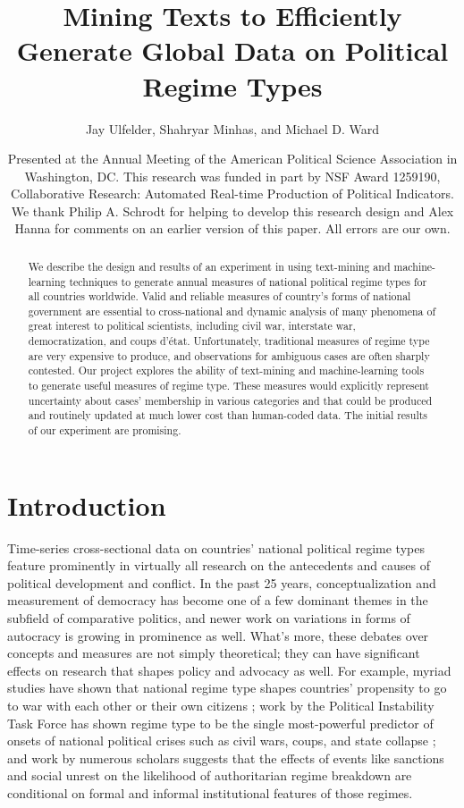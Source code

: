 \documentclass[pdftex,12pt,fullpage,oneside]{amsart}
\title{Mining Texts to Efficiently Generate Global Data on Political Regime Types}
\author{Jay Ulfelder, Shahryar Minhas, and Michael D. Ward}
\date{Presented at the Annual Meeting of the American Political Science Association in Washington, DC. This research was funded in part by NSF Award 1259190, Collaborative Research: Automated Real-time Production of Political Indicators. We thank Philip A. Schrodt for helping to develop this research design and Alex Hanna for comments on an earlier version of this paper. All errors are our own.}
\begin{document}
\maketitle

\singlespacing
\begin{abstract}
We describe the design and results of an experiment in using text-mining and machine-learning techniques to generate annual measures of national political regime types for all countries worldwide. Valid and reliable measures of country's forms of national government are essential to cross-national and dynamic analysis of many phenomena of great interest to political scientists, including civil war, interstate war, democratization, and coups d'\'{e}tat. Unfortunately, traditional measures of regime type are very expensive to produce, and observations for ambiguous cases are often sharply contested. Our project explores the ability of text-mining and machine-learning tools to generate useful measures of regime type. These measures would explicitly represent uncertainty about cases' membership in various categories and that could be produced and routinely updated at much lower cost than human-coded data. The initial results of our experiment are promising.
\end{abstract} 

\doublespacing

\section{Introduction}

Time-series cross-sectional data on countries' national political regime types feature prominently in virtually all research on the antecedents and causes of political development and conflict. In the past 25 years, conceptualization and measurement of democracy has become one of a few dominant themes in the subfield of comparative politics, and newer work on variations in forms of autocracy is growing in prominence as well. What's more, these debates over concepts and measures are not simply theoretical; they can have significant effects on research that shapes policy and advocacy as well. For example, myriad studies have shown that national regime type shapes countries' propensity to go to war with each other or their own citizens \cite{hegre:2014}; work by the Political Instability Task Force has shown regime type to be the single most-powerful predictor of onsets of national political crises such as civil wars, coups, and state collapse \cite{goldstone2010global}; and work by numerous scholars suggests that the effects of events like sanctions \cite{geddes:2002,escriba-foch:wright:2010} and social unrest \cite{ulfelder:2005} on the likelihood of authoritarian regime breakdown are conditional on formal and informal institutional features of those regimes.
\end{document}
